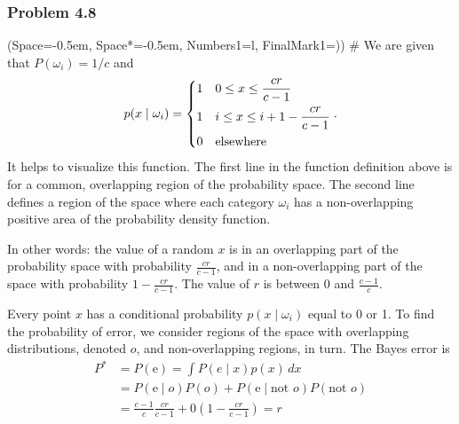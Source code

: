 \documentclass[12pt, a4paper]{article}
\newcommand{\listSpace}{-0.5em}%
\begin{document}
\subsubsection*{Problem 4.8}
\begin{easylist}[enumerate]
\ListProperties(Space=\listSpace, Space*=\listSpace, Numbers1=l, FinalMark1={)})
# We are given that $P(\omega_i) = 1 / c$ and 
\begin{equation*}
	p(x \mid \omega_i) = 
	\begin{dcases}
	1 & 0 \leq x \leq \frac{cr}{c-1} \\
	1 & i \leq x \leq i + 1 - \frac{cr}{c-1} \\
	0 & \text{elsewhere}
	\end{dcases}.
\end{equation*}
It helps to visualize this function.
The first line in the function definition above is for a common, overlapping region of the probability space.
The second line defines a region of the space where each category $\omega_i$ has a non-overlapping positive area of the probability density function.

In other words: the value of a random $x$ is in an overlapping part of the probability space with probability $\frac{cr}{c-1}$, and in a non-overlapping part of the space with probability $1 - \frac{cr}{c-1}$.
The value of $r$ is between $0$ and $\frac{c-1}{c}$.

Every point $x$ has a conditional probability $p(x \mid \omega_i)$ equal to 0 or 1.
To find the probability of error, we consider regions of the space with overlapping distributions, denoted $o$, and non-overlapping regions, in turn.
The Bayes error is 
\begin{align*}
	P^* &= P (\text{e})  = \int P(e \mid x) p(x) \, dx \\
	&=P (\text{e} \mid o) P (o) +
	 P (\text{e} \mid \text{not } o) P (\text{not } o ) \\
	 &= \frac{c-1}{c} \frac{cr}{c-1}  +
	 0  \left(1 - \frac{cr}{c-1} \right) = r
\end{align*}


\end{easylist}
\end{document}
